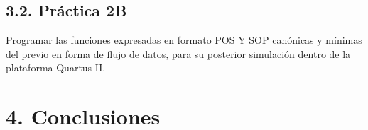 \documentclass[letterpaper]{article} %
\begin{document}
                

                

        \subsection*{3.2. Pr\'actica 2B}
        Programar las funciones expresadas en formato POS Y SOP can\'onicas y m\'inimas del previo
        en forma de flujo de datos, para su posterior simulación dentro de la plataforma Quartus II.

        

    \section*{4. Conclusiones}

    
\end{document}
